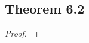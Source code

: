 \documentclass[../../main.tex]{subfiles}
\begin{document}
\subsection{Theorem 6.2}
\begin{wts}

\end{wts}
\begin{proof}

\end{proof}
\end{document}
